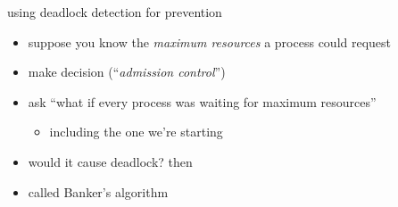 \begin{frame}{using deadlock detection for prevention}
\begin{itemize}
\item suppose you know the \textit{maximum resources} a process could request
\item make decision  (``\textit{admission control}'')
\vspace{.5cm}
\item<2-> ask ``what if every process was waiting for maximum resources''
    \begin{itemize}
    \item including the one we're starting
    \end{itemize}
\item<2-> would it cause deadlock? then 
\vspace{.5cm}
\item<2-> called Banker's algorithm
\end{itemize}
\end{frame}
